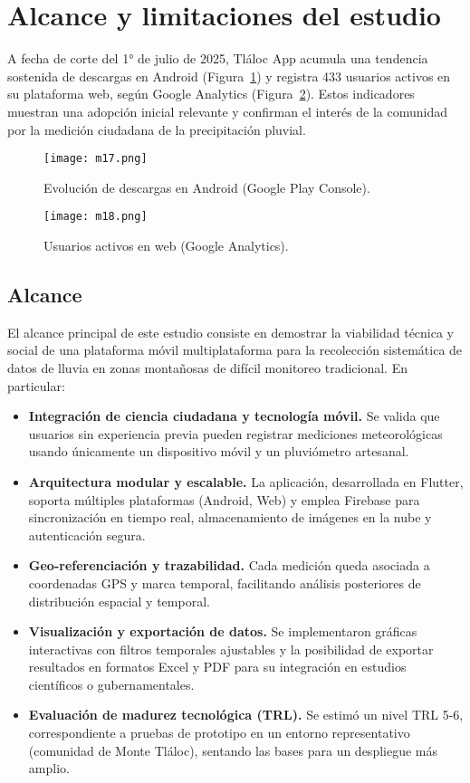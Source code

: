 \newpage
\section{Alcance y limitaciones del estudio}

A fecha de corte del 1° de julio de 2025, Tláloc App acumula una tendencia sostenida de descargas en Android (Figura~\ref{m17}) y registra 433 usuarios activos en su plataforma web, según Google Analytics (Figura~\ref{m18}). Estos indicadores muestran una adopción inicial relevante y confirman el interés de la comunidad por la medición ciudadana de la precipitación pluvial.

\begin{figure}[h!]
  \centering
  \texttt{[image: m17.png]}
  \caption{Evolución de descargas en Android (Google Play Console).}
  \label{m17}
\end{figure}

\begin{figure}[h!]
  \centering
  \texttt{[image: m18.png]}
  \caption{Usuarios activos en web (Google Analytics).}
  \label{m18}
\end{figure}

\subsection{Alcance}

El alcance principal de este estudio consiste en demostrar la viabilidad técnica y social de una plataforma móvil multiplataforma para la recolección sistemática de datos de lluvia en zonas montañosas de difícil monitoreo tradicional. En particular:

\begin{itemize}
  \item \textbf{Integración de ciencia ciudadana y tecnología móvil.} Se valida que usuarios sin experiencia previa pueden registrar mediciones meteorológicas usando únicamente un dispositivo móvil y un pluviómetro artesanal.
  \item \textbf{Arquitectura modular y escalable.} La aplicación, desarrollada en Flutter, soporta múltiples plataformas (Android, Web) y emplea Firebase para sincronización en tiempo real, almacenamiento de imágenes en la nube y autenticación segura.
  \item \textbf{Geo-referenciación y trazabilidad.} Cada medición queda asociada a coordenadas GPS y marca temporal, facilitando análisis posteriores de distribución espacial y temporal.
  \item \textbf{Visualización y exportación de datos.} Se implementaron gráficas interactivas con filtros temporales ajustables y la posibilidad de exportar resultados en formatos Excel y PDF para su integración en estudios científicos o gubernamentales.
  \item \textbf{Evaluación de madurez tecnológica (TRL).} Se estimó un nivel TRL 5-6, correspondiente a pruebas de prototipo en un entorno representativo (comunidad de Monte Tláloc), sentando las bases para un despliegue más amplio.
\end{itemize}

